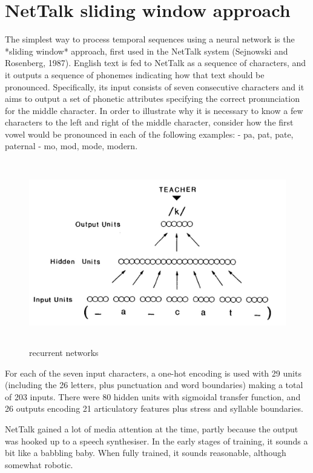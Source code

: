 \documentclass[11pt]{article}
\begin{document}
\section{NetTalk sliding window approach}
The simplest way to process temporal sequences using a neural network is the
*sliding window* approach, first used in the NetTalk system (Sejnowski and
Rosenberg, 1987).
English text is fed to NetTalk as a sequence of characters, and it outputs a
sequence of phonemes indicating how that text should be pronounced.
Specifically, its input consists of seven consecutive characters and it aims
to output a set of phonetic attributes specifying the correct pronunciation for
the middle character.
In order to illustrate why it is necessary to know a few characters to the left
and right of the middle character, consider how the first vowel would be
pronounced in each of the following examples:
- pa, pat, pate, paternal
- mo, mod, mode, modern.

\begin{figure}
    \centering
    \includegraphics[width=12cm, height=8cm]{../out/images/recurrent-networks}
    \caption[recurrent networks]{recurrent networks}
    \label{fig: recurrent networks}
\end{figure}

For each of the seven input characters, a one-hot encoding is used with 29
units (including the 26 letters, plus punctuation and word boundaries) making a
total of 203 inputs.
There were 80 hidden units with sigmoidal transfer function, and 26 outputs
encoding 21 articulatory features plus stress and syllable boundaries.

NetTalk gained a lot of media attention at the time, partly because the output
was hooked up to a speech synthesiser.
In the early stages of training, it sounds a bit like a babbling baby.
When fully trained, it sounds reasonable, although somewhat robotic.
\end{document}
